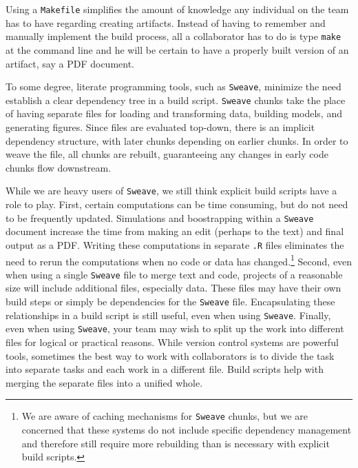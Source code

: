 \documentclass[]{article}
\begin{document}
Using a \texttt{Makefile} simplifies the amount of knowledge any individual on
the team has to have regarding creating artifacts. Instead of having to
remember and manually implement the build process, all a collaborator has to
do is type \texttt{make} at the command line and he will be certain to have a
properly built version of an artifact, say a PDF document.

To some degree, literate programming tools, such as \texttt{Sweave}, minimize
the need establish a clear dependency tree in a build script. \texttt{Sweave}
chunks take the place of
having separate files for loading and transforming data, building models, and
generating figures. Since files are evaluated top-down, there is an implicit
dependency structure, with later chunks depending on earlier chunks. In order
to weave the file, all chunks are rebuilt, guaranteeing any changes in early
code chunks flow downstream.

While we are heavy users of \texttt{Sweave}, we still think explicit build
scripts have a role to play. First, certain computations can be time
consuming, but do not need to be frequently updated. Simulations and
boostrapping within a \texttt{Sweave} document increase the time from making
an edit (perhaps to the text) and final output as a PDF. Writing these
computations in separate \texttt{.R} files eliminates the need to rerun the
computations when no code or data has changed.\footnote{We are aware of caching
mechanisms for \texttt{Sweave} chunks, but we are concerned that these systems
do not include specific dependency management and therefore still require more
rebuilding than is necessary with explicit build scripts.} Second, even when
using a single \texttt{Sweave} file to merge text and code, projects of a
reasonable size will include additional files, especially data. These files
may have their own build steps or simply be dependencies for the
\texttt{Sweave} file. Encapsulating these relationships in a build script is
still useful, even when using \texttt{Sweave}. Finally, even when using
\texttt{Sweave}, your team may wish to split up the work into different files
for logical or practical reasons. While version control systems are powerful
tools, sometimes the best way to work with collaborators is to divide the task
into separate tasks and each work in a different file. Build scripts help with
merging the separate files into a unified whole.
\end{document}
